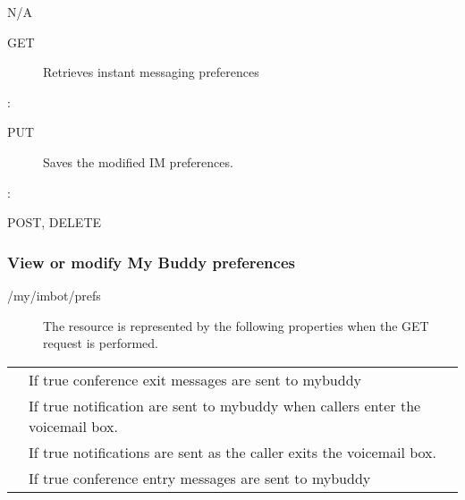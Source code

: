 \documentclass[letterpaper,10pt,english]{sphinxmanual}
\begin{document}
 N/A
\begin{description}
\item[{ GET}] \leavevmode
Retrieves instant messaging preferences

\end{description}

:

\begin{sphinxVerbatim}[commandchars=\\\{\}]
\end{sphinxVerbatim}
\begin{description}
\item[{ PUT}] \leavevmode
Saves the modified IM preferences.

\end{description}

:

\begin{sphinxVerbatim}[commandchars=\\\{\}]
\end{sphinxVerbatim}

 POST, DELETE


\subsubsection{View or modify My Buddy preferences}
\label{\detokenize{restapi:view-or-modify-my-buddy-preferences}}
 /my/imbot/prefs
\begin{description}
\item[{}] \leavevmode
The resource is represented by the following properties when the GET request is performed.

\end{description}


\begin{savenotes}\sphinxattablestart
\centering
\begin{tabulary}{\linewidth}[t]{|T|T|}
\hline

&
\\
\hline
{}
&
If true conference exit messages are sent to mybuddy
\\
\hline
{}
&
If true notification are sent to mybuddy when callers enter the voicemail box.
\\
\hline
{}
&
If true notifications are sent as the caller exits the voicemail box.
\\
\hline
{}
&
If true conference entry messages are sent to mybuddy
\\
\hline
\end{tabulary}
\par
\sphinxattableend\end{savenotes}
\end{document}
